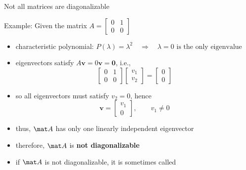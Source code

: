 \begin{frame}{Not all matrices are diagonalizable}

    \begin{alertblock}{Example:}\medskip
        Given the matrix  \hspace*{9pc}
        $ A =
            \begin{bmatrix}
                0 & 1 \\
                0 & 0
            \end{bmatrix}
        $
    \end{alertblock}

    \begin{itemize}
        \item characteristic polynomial:\hspace*{12pt}
              $P(\lambda) = \lambda^{2} \quad \Rightarrow \quad \lambda = 0 \text{ is the only eigenvalue}$

        \item eigenvectors satisfy \(A\mathbf{v} = 0\mathbf{v} = \mathbf{0}\), i.e.,
              \[
                  \begin{bmatrix}
                      0 & 1 \\
                      0 & 0
                  \end{bmatrix}
                  \begin{bmatrix}
                      v_1 \\
                      v_2
                  \end{bmatrix}
                  =
                  \begin{bmatrix}
                      0 \\
                      0
                  \end{bmatrix}
              \]

        \item so all eigenvectors must satisfy \(v_2 = 0\), hence
              \[
                  \mathbf{v} =
                  \begin{bmatrix}
                      v_1 \\[2pt]
                      0
                  \end{bmatrix},
                  \qquad v_1 \neq 0
              \]

        \item thus, $\mat A$ has only one linearly independent eigenvector

        \item therefore, $\mat A$ is \textbf{not diagonalizable}
        \item if $\mat A$ is not diagonalizable, it is sometimes called \textbf{}
    \end{itemize}
    \vfill
\end{frame}




